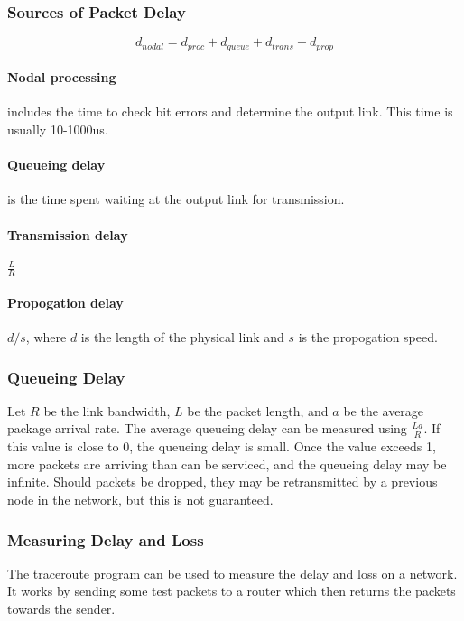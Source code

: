 \documentclass[12pt,titlepage]{article}
\begin{document}
      \subsubsection{Sources of Packet Delay}
        $$d_{nodal} = d_{proc} + d_{queue} + d_{trans} + d_{prop}$$
      
        \paragraph{Nodal processing} includes the time to check bit errors and determine the output link. This time is usually 10-1000us.

        \paragraph{Queueing delay} is the time spent waiting at the output link for transmission.

        \paragraph{Transmission delay} $\frac{L}{R}$

        \paragraph{Propogation delay} $d/s$, where $d$ is the length of the physical link and $s$ is the propogation speed.

      \subsubsection{Queueing Delay}
        Let $R$ be the link bandwidth, $L$ be the packet length, and $a$ be the average package arrival rate. The average queueing delay
        can be measured using $\frac{La}{R}$. If this value is close to 0, the queueing delay is small. Once the value exceeds 1, more
        packets are arriving than can be serviced, and the queueing delay may be infinite. Should packets be dropped, they may be
        retransmitted by a previous node in the network, but this is not guaranteed.

      \subsubsection{Measuring Delay and Loss}
        The traceroute program can be used to measure the delay and loss on a network. It works by sending some test packets to a router which
        then returns the packets towards the sender.
\end{document}
